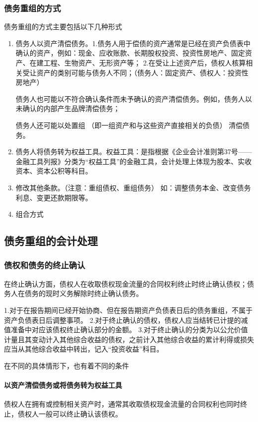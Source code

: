 \documentclass[UTF8,12pt]{ctexart}
\numberwithin{equation}{section} %
\numberwithin{figure}{section}
\numberwithin{table}{section}
\begin{document}
	
	\subsubsection{债务重组的方式}
	债务重组的方式主要包括以下几种形式
	\begin{enumerate}
		\item 债务人以资产清偿债务。1.债务人用于偿债的资产通常是已经在资产负债表中确认的资产，例如：现金、应收账款、长期股权投资、投资性房地产、固定资产、在建工程、生物资产、无形资产等；
		2.在受让上述资产后，债权人核算相关受让资产的类别可能与债务人不同；（债务人：固定资产、债权人：投资性房地产）
		
		债务人也可能以不符合确认条件而未予确认的资产清偿债务。例如，债务人以未确认的内部产生品牌清偿债务；
		
		债务人还可能以处置组 （即一组资产和与这些资产直接相关的负债） 清偿债务。
		
		\item 债务人将债务转为权益工具。权益工具：是指根据《企业会计准则第37号——金融工具列报》分类为“权益工具”的金融工具，会计处理上体现为股本、实收资本、资本公积等科目。
		
		\item 修改其他条款。（注意：重组债权、重组债务）
		如：调整债务本金、改变债务利息、变更还款期限等。
		
		
		\item 组合方式
	\end{enumerate}
	
	\subsection{债务重组的会计处理}
	\subsubsection{债权和债务的终止确认}
	在终止确认方面，债权人在收取债权现金流量的合同权利终止时终止确认债权；债务人在债务的现时义务解除时终止确认债务。
	
	1.对于在报告期间已经开始协商、但在报告期资产负债表日后的债务重组，不属于资产负债表日后调整事项。
	2.对于终止确认的债权，债权人应当结转已计提的减值准备中对应该债权终止确认部分的金额。
	3.对于终止确认的分类为以公允价值计量且其变动计入其他综合收益的债权，之前计入其他综合收益的累计利得或损失应当从其他综合收益中转出，记入“投资收益”科目。
	
	在不同的具体情形下，也有着不同的条件
	\paragraph{以资产清偿债务或将债务转为权益工具}
	债权人在拥有或控制相关资产时，通常其收取债权现金流量的合同权利也同时终止，债权人一般可以终止确认该债权。
	
\end{document}
